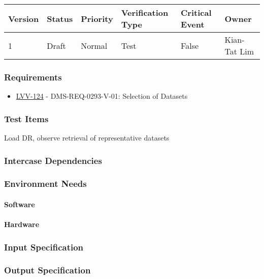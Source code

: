 \begin{longtable}[]{llllll}
\toprule
Version & Status & Priority & Verification Type & Critical Event & Owner
\\\midrule
1 & Draft & Normal &
Test & False & Kian-Tat Lim
\\\bottomrule
\end{longtable}

\subsubsection{Requirements}
\begin{itemize}
\item \href{https://jira.lsstcorp.org/browse/LVV-124}{LVV-124} - DMS-REQ-0293-V-01: Selection of Datasets
\end{itemize}

\subsubsection{Test Items}
Load DR, observe retrieval of representative datasets



\subsubsection{Intercase Dependencies}

\subsubsection{Environment Needs}

\paragraph{Software}

\paragraph{Hardware}

\subsubsection{Input Specification}

\subsubsection{Output Specification}


